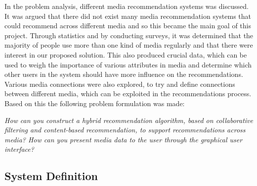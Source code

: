 In the problem analysis, different media recommendation systems was discussed. It was argued that there did not exist many media recommendation systems that could recommend across different media and so this became the main goal of this project. Through statistics and by conducting surveys, it was determined that the majority of people use more than one kind of media regularly and that there were interest in our proposed solution. This also produced crucial data, which can be used to weigh the importance of various attributes in media and determine which other users in the system should have more influence on the recommendations. Various media connections were also explored, to try and define connections between different media, which can be exploited in the recommendations process. Based on this the following problem formulation was made:




\textit{How can you construct a hybrid recommendation algorithm, based on collaborative filtering and content-based recommendation, to support recommendations across media? How can you present media data to the user through the graphical user interface?}

\subsection{System Definition}
\label{SysDefinition}
